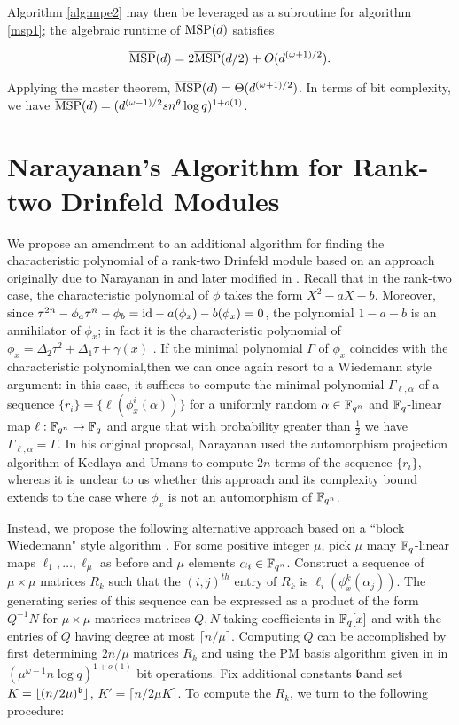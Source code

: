 Algorithm \ref{alg:mpe2} may then be leveraged as a subroutine for algorithm \ref{msp1}; the algebraic runtime of $\textnormal{MSP}(d)$ satisfies

\begin{equation*}
    \overline{\textnormal{MSP}}(d) = 2\overline{\textnormal{MSP}}(d/2) + O(d^{(\omega + 1)/2}).
\end{equation*}

Applying the master theorem, $\overline{\textnormal{MSP}}(d) = \Theta(d^{(\omega + 1)/2})$. In terms of bit complexity, we have $ \overline{\textnormal{MSP}}(d) = (d^{(\omega-1)/2}sn^{\theta} \log q)^{1 + o(1)}$.

\section{Narayanan's Algorithm for Rank-two Drinfeld Modules}

We propose an amendment to an additional algorithm for finding the characteristic polynomial of a rank-two Drinfeld module based on an approach originally due to Narayanan in \cite{Narayanan18} and later modified in \cite{musschost}. Recall that in the rank-two case, the characteristic polynomial of $\phi$ takes the form $X^2 - aX - b$. Moreover, since $\tau^{2n} - \phi_a\tau^n - \phi_b = \textnormal{id} - a(\phi_x) - b(\phi_x) = 0$, the polynomial $1 - a - b$ is an annihilator of $\phi_x$; in fact it is the characteristic polynomial of $\phi_x = \Delta_2 \tau^2 + \Delta_1 \tau + \gamma(x)$ \cite{GEKELE1991187}. If the minimal polynomial $\Gamma$ of $\phi_x$ coincides with the characteristic polynomial,then we can once again resort to a Wiedemann style argument: in this case, it suffices to compute the minimal polynomial $\Gamma_{\ell, \alpha}$ of a sequence $\{r_i\} = \{\ell(\phi_x^i(\alpha)) \}$ for a uniformly random $\alpha \in \mathbb{F}_{q^n}$ and $\mathbb{F}_q$-linear map $\ell: \mathbb{F}_{q^n} \to \mathbb{F}_q$ and argue that with probability greater than $\frac{1}{2}$ we have $\Gamma_{\ell, \alpha} = \Gamma$. In his original proposal, Narayanan used the automorphism projection algorithm of Kedlaya and Umans to compute $2n$ terms of the sequence $\{ r_i \}$, whereas it is unclear to us whether this approach and its complexity bound extends to the case where $\phi_x$ is not an automorphism of $\mathbb{F}_{q^n}$. 

Instead, we propose the following alternative approach based on a ``block Wiedemann" style algorithm \cite{Coppersmith94}. For some positive integer $\mu$, pick $\mu$ many $\mathbb{F}_q$-linear maps $\ell_1, \ldots, \ell_{\mu}$ as before and $\mu$ elements $\alpha_i \in \mathbb{F}_{q^n}$. Construct a sequence of $\mu \times \mu$ matrices $R_{k}$ such that the $(i,j)^{th}$ entry of $R_k$ is $ \ell_i(\phi_x^k(\alpha_j))$. The generating series of this sequence can be expressed as a product of the form $Q^{-1}N$ for  $\mu \times \mu$ matrices matrices $Q,N$ taking coefficients in $\mathbb{F}_q[x]$ and with the entries of $Q$ having degree at most $\lceil n/\mu \rceil$. Computing $Q$ can be accomplished by first determining $2n/\mu$ matrices $R_k$ and using the PM basis algorithm given in \cite{GiJeVi03} in $(\mu^{\omega - 1}n\log q)^{1 + o(1)}$ bit operations. Fix additional constants $\frak{b}$and set $K = \lfloor (n/2\mu)^{\frak{b}} \rfloor$, $K' = \lceil n/2\mu K \rceil$. To compute the $R_k$, we turn to the following procedure:

